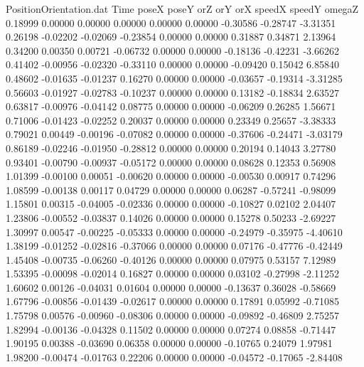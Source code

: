 \begin{filecontents}{PositionOrientation.dat}
Time poseX poseY orZ orY orX speedX speedY omegaZ
   0.18999    0.00000    0.00000     0.00000    0.00000    0.00000   -0.30586   -0.28747   -3.31351
   0.26198   -0.02202   -0.02069    -0.23854    0.00000    0.00000    0.31887    0.34871    2.13964
   0.34200    0.00350    0.00721    -0.06732    0.00000    0.00000   -0.18136   -0.42231   -3.66262
   0.41402   -0.00956   -0.02320    -0.33110    0.00000    0.00000   -0.09420    0.15042    6.85840
   0.48602   -0.01635   -0.01237     0.16270    0.00000    0.00000   -0.03657   -0.19314   -3.31285
   0.56603   -0.01927   -0.02783    -0.10237    0.00000    0.00000    0.13182   -0.18834    2.63527
   0.63817   -0.00976   -0.04142     0.08775    0.00000    0.00000   -0.06209    0.26285    1.56671
   0.71006   -0.01423   -0.02252     0.20037    0.00000    0.00000    0.23349    0.25657   -3.38333
   0.79021    0.00449   -0.00196    -0.07082    0.00000    0.00000   -0.37606   -0.24471   -3.03179
   0.86189   -0.02246   -0.01950    -0.28812    0.00000    0.00000    0.20194    0.14043    3.27780
   0.93401   -0.00790   -0.00937    -0.05172    0.00000    0.00000    0.08628    0.12353    0.56908
   1.01399   -0.00100    0.00051    -0.00620    0.00000    0.00000   -0.00530    0.00917    0.74296
   1.08599   -0.00138    0.00117     0.04729    0.00000    0.00000    0.06287   -0.57241   -0.98099
   1.15801    0.00315   -0.04005    -0.02336    0.00000    0.00000   -0.10827    0.02102    2.04407
   1.23806   -0.00552   -0.03837     0.14026    0.00000    0.00000    0.15278    0.50233   -2.69227
   1.30997    0.00547   -0.00225    -0.05333    0.00000    0.00000   -0.24979   -0.35975   -4.40610
   1.38199   -0.01252   -0.02816    -0.37066    0.00000    0.00000    0.07176   -0.47776   -0.42449
   1.45408   -0.00735   -0.06260    -0.40126    0.00000    0.00000    0.07975    0.53157    7.12989
   1.53395   -0.00098   -0.02014     0.16827    0.00000    0.00000    0.03102   -0.27998   -2.11252
   1.60602    0.00126   -0.04031     0.01604    0.00000    0.00000   -0.13637    0.36028   -0.58669
   1.67796   -0.00856   -0.01439    -0.02617    0.00000    0.00000    0.17891    0.05992   -0.71085
   1.75798    0.00576   -0.00960    -0.08306    0.00000    0.00000   -0.09892   -0.46809    2.75257
   1.82994   -0.00136   -0.04328     0.11502    0.00000    0.00000    0.07274    0.08858   -0.71447
   1.90195    0.00388   -0.03690     0.06358    0.00000    0.00000   -0.10765    0.24079    1.97981
   1.98200   -0.00474   -0.01763     0.22206    0.00000    0.00000   -0.04572   -0.17065   -2.84408

\end{filecontents}
